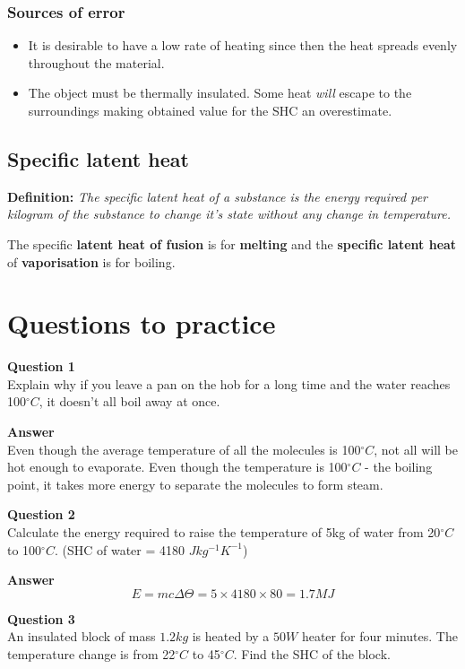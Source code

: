 \documentclass{article}
\begin{document}
\subsubsection*{Sources of error}
\begin{itemize}
	\item It is desirable to have a low rate of heating since then the heat spreads evenly throughout the material.
	\item The object must be thermally insulated. Some heat \textit{will} escape to the surroundings making obtained value for the SHC an overestimate.
\end{itemize}

\subsection*{Specific latent heat}
\textbf{Definition:} \textit{The specific latent heat of a substance is the energy required per kilogram of the substance to change it's state without any change in temperature.}

The specific \textbf{latent heat of fusion} is for \textbf{melting} and the \textbf{specific latent heat} of \textbf{vaporisation} is for boiling.

\section*{Questions to practice}
\textbf{Question 1}\\
Explain why if you leave a pan on  the hob for a long time and the water reaches 100$^{\circ}C$, it doesn't all boil away at once.

\textbf{Answer}\\
Even though the average temperature of all the molecules is 100$^{\circ}C$, not all will be hot enough to evaporate. Even though the temperature is 100$^{\circ}C$ - the boiling point, it takes more energy to separate the molecules to form steam.

\textbf{Question 2}\\
Calculate the energy required to raise the temperature of 5kg of water from 20$^{\circ}C$ to 100$^{\circ}C$. (SHC of water = 4180 $Jkg^{-1}K^{-1}$)

\textbf{Answer}\\
\[
	E = mc \Delta \Theta = 5 \times 4180 \times 80 = 1.7MJ
\]

\newpage

\textbf{Question 3}\\
An insulated block of mass $1.2kg$ is heated by a $50W$ heater for four minutes. The temperature change is from 22$^{\circ}C$ to 45$^{\circ}C$. Find the SHC of the block.
\end{document}
